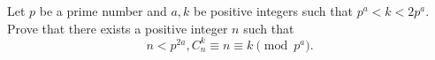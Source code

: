 Let $p$ be a prime number and $a, k$ be positive integers such that $p^a<k<2p^a$. Prove that there exists a positive integer $n$ such that \[n<p^{2a},  C_n^k\equiv n\equiv k\pmod {p^a}.\]